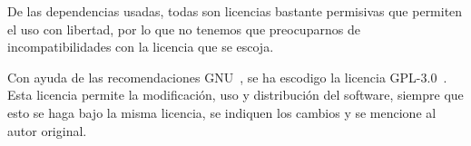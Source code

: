 De las dependencias usadas, todas son licencias bastante permisivas que 
permiten el uso con libertad, por lo que no tenemos que preocuparnos de 
incompatibilidades con la licencia que se escoja.

Con ayuda de las recomendaciones GNU~\cite{gnu-choose}, se ha escodigo la 
licencia GPL-3.0~\cite{gpl3}. Esta licencia permite la modificación, uso y 
distribución del software, siempre que esto se haga bajo la misma licencia, se 
indiquen los cambios y se mencione al autor original.

